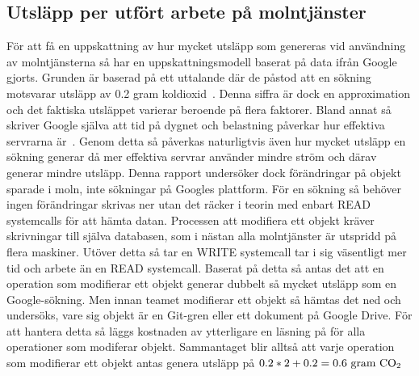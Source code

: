 \subsection{Utsläpp per utfört arbete på molntjänster}
\label{joel_a-method-cloud-eq}
För att få en uppskattning av hur mycket utsläpp som genereras vid användning av molntjänsterna så har en uppskattningsmodell baserat på data ifrån Google gjorts. Grunden är baserad på ett  uttalande där de påstod att en sökning motsvarar utsläpp av 0.2 gram koldioxid~\cite{google-blog}. Denna siffra är dock en approximation och det faktiska utsläppet varierar beroende på flera faktorer. Bland annat så skriver Google själva att tid på dygnet och belastning påverkar hur effektiva servrarna är~\cite{google-warehouse}. Genom detta så påverkas naturligtvis även hur mycket utsläpp en sökning generar då mer effektiva servrar använder mindre ström och därav generar mindre utsläpp. Denna rapport undersöker dock förändringar på objekt sparade i moln, inte sökningar på Googles plattform. För en sökning så behöver ingen förändringar skrivas ner utan det räcker i teorin med enbart READ systemcalls för att hämta datan. Processen att modifiera ett objekt kräver skrivningar till själva databasen, som i nästan alla molntjänster är utspridd på flera maskiner. Utöver detta så tar en WRITE systemcall tar i sig väsentligt mer tid och arbete än en READ systemcall. Baserat på detta så antas det att en operation som modifierar ett objekt generar dubbelt så mycket utsläpp som en Google-sökning. Men innan teamet modifierar ett objekt så hämtas det ned och undersöks, vare sig objekt är en Git-gren eller ett dokument på Google Drive. För att hantera detta så läggs kostnaden av ytterligare en läsning på för alla operationer som modiferar objekt. Sammantaget blir alltså att varje operation som modifierar ett objekt antas genera utsläpp på $0.2 * 2 + 0.2 = 0.6 \text{ gram \ce{CO2} }$



